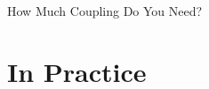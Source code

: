 \documentclass[aspectratio=169]{beamer}
\begin{document}
\begin{frame}{How Much Coupling Do You Need?}
\end{frame}



\section{In Practice}
\end{document}

